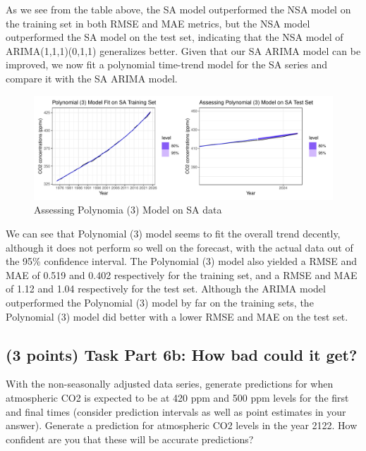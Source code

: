 \documentclass[
]{article}
\begin{document}
As we see from the table above, the SA model outperformed the NSA model on the training set in both RMSE and MAE metrics, but the NSA model outperformed the SA model on the test set, indicating that the NSA model of ARIMA(1,1,1)(0,1,1) generalizes better. Given that our SA ARIMA model can be improved, we now fit a polynomial time-trend model for the SA series and compare it with the SA ARIMA model.

\newpage

\begin{figure}

{\centering \includegraphics[width=1\linewidth]{lab_prompt_Updated_files/figure-latex/SA-poly-model-1} 

}

\caption{Assessing Polynomia (3) Model on SA data}\label{fig:SA-poly-model}
\end{figure}

We can see that Polynomial (3) model seems to fit the overall trend decently, although it does not perform so well on the forecast, with the actual data out of the 95\% confidence interval. The Polynomial (3) model also yielded a RMSE and MAE of 0.519 and 0.402 respectively for the training set, and a RMSE and MAE of 1.12 and 1.04 respectively for the test set. Although the ARIMA model outperformed the Polynomial (3) model by far on the training sets, the Polynomial (3) model did better with a lower RMSE and MAE on the test set.

\subsection{(3 points) Task Part 6b: How bad could it get?}\label{points-task-part-6b-how-bad-could-it-get}

With the non-seasonally adjusted data series, generate predictions for when atmospheric CO2 is expected to be at 420 ppm and 500 ppm levels for the first and final times (consider prediction intervals as well as point estimates in your answer). Generate a prediction for atmospheric CO2 levels in the year 2122. How confident are you that these will be accurate predictions?
\end{document}
